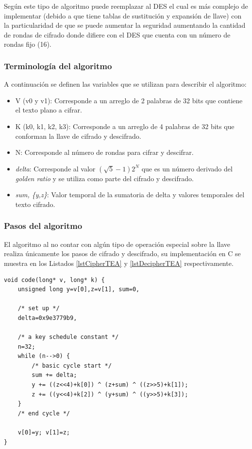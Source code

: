 Según \cite{tea} este tipo de algoritmo puede reemplazar al DES el cual es más complejo de implementar (debido a que tiene tablas de sustitución y expansión de llave) con la particularidad de que se puede aumentar la seguridad aumentando la cantidad de rondas de cifrado donde difiere con el DES que cuenta con un número de rondas fijo (16).

\subsubsection{Terminología del algoritmo}
A continuación se definen las variables que se utilizan para describir el algoritmo:
\begin{itemize}
\item V (v0 y v1): Corresponde a un arreglo de 2 palabras de 32 bits que contiene el texto plano a cifrar.

\item K (k0, k1, k2, k3): Corresponde a un arreglo de 4 palabras de 32 bits que conforman la llave de cifrado y descifrado.

\item N: Corresponde al número de rondas para cifrar y descifrar.

\item \textit{delta}: Corresponde al valor $(\sqrt{5}-1)2^N$ que es un número derivado del \textit{golden ratio} y se utiliza como parte del cifrado y descifrado.

\item \textit{sum, \{y,z\}}: Valor temporal de la sumatoria de delta y valores temporales del texto cifrado.
\end{itemize}


\subsubsection{Pasos del algoritmo}
El algoritmo al no contar con algún tipo de operación especial sobre la llave realiza únicamente los pasos de cifrado y descifrado, su implementación en C se muestra en los Listados \ref{lstCipherTEA} y \ref{lstDecipherTEA} respectivamente.

\begin{lstlisting}[caption=Código en C del paso de cifrado en el algoritmo TEA \citep{tea}., label={lstCipherTEA}, mathescape]
void code(long* v, long* k) {
	unsigned long y=v[0],z=v[1], sum=0,
	
	/* set up */
	delta=0x9e3779b9,

	/* a key schedule constant */
	n=32;
	while (n-->0) {
		/* basic cycle start */
		sum += delta;
		y += ((z<<4)+k[0]) ^ (z+sum) ^ ((z>>5)+k[1]);
		z += ((y<<4)+k[2]) ^ (y+sum) ^ ((y>>5)+k[3]);
	}
	/* end cycle */
	
	v[0]=y; v[1]=z; 
}
\end{lstlisting}



